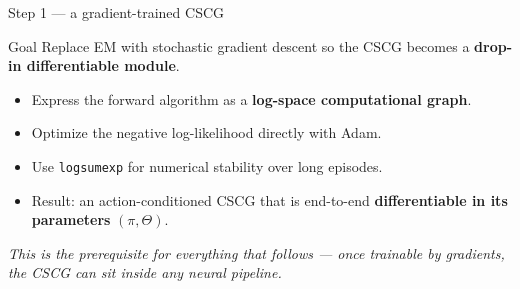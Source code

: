 \documentclass[aspectratio=169,10pt]{beamer}
\begin{document}
\begin{frame}{Step 1 --- a gradient-trained CSCG}
  \begin{block}{Goal}
    Replace EM with stochastic gradient descent so the CSCG becomes a
    \textbf{drop-in differentiable module}.
  \end{block}
  \vspace{0.4em}
  \begin{itemize}\setlength\itemsep{0.45em}
    \item Express the forward algorithm as a \textbf{log-space computational
          graph}.
    \item Optimize the negative log-likelihood directly with Adam.
    \item Use \texttt{logsumexp} for numerical stability over long episodes.
    \item Result: an action-conditioned CSCG that is end-to-end
          \textbf{differentiable in its parameters} $(\pi, \Theta)$.
  \end{itemize}
  \vspace{0.4em}
  \begin{center}
    \color{deepblue}\itshape
    This is the prerequisite for everything that follows --- once trainable
    by gradients, the CSCG can sit inside any neural pipeline.
  \end{center}
\end{frame}
\end{document}
